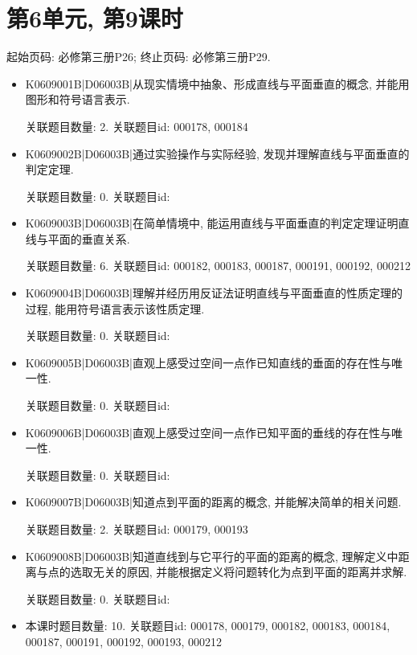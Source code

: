 \section*{第6单元, 第9课时}
起始页码: 必修第三册P26; 终止页码: 必修第三册P29.
\begin{itemize}
\item K0609001B|D06003B|从现实情境中抽象、形成直线与平面垂直的概念, 并能用图形和符号语言表示.

关联题目数量: 2. 关联题目id: 000178, 000184

\item K0609002B|D06003B|通过实验操作与实际经验, 发现并理解直线与平面垂直的判定定理.

关联题目数量: 0. 关联题目id: 

\item K0609003B|D06003B|在简单情境中, 能运用直线与平面垂直的判定定理证明直线与平面的垂直关系.

关联题目数量: 6. 关联题目id: 000182, 000183, 000187, 000191, 000192, 000212

\item K0609004B|D06003B|理解并经历用反证法证明直线与平面垂直的性质定理的过程, 能用符号语言表示该性质定理.

关联题目数量: 0. 关联题目id: 

\item K0609005B|D06003B|直观上感受过空间一点作已知直线的垂面的存在性与唯一性.

关联题目数量: 0. 关联题目id: 

\item K0609006B|D06003B|直观上感受过空间一点作已知平面的垂线的存在性与唯一性.

关联题目数量: 0. 关联题目id: 

\item K0609007B|D06003B|知道点到平面的距离的概念, 并能解决简单的相关问题.

关联题目数量: 2. 关联题目id: 000179, 000193

\item K0609008B|D06003B|知道直线到与它平行的平面的距离的概念, 理解定义中距离与点的选取无关的原因, 并能根据定义将问题转化为点到平面的距离并求解.

关联题目数量: 0. 关联题目id: 

\item 本课时题目数量: 10. 关联题目id: 000178, 000179, 000182, 000183, 000184, 000187, 000191, 000192, 000193, 000212

\end{itemize}

